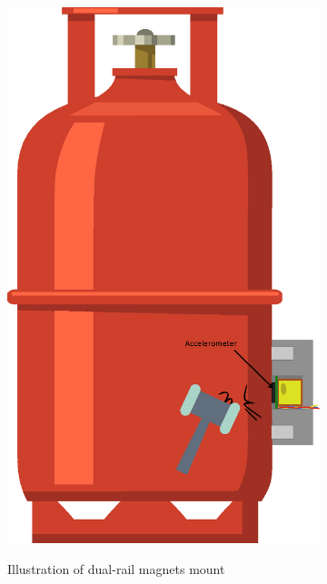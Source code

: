 \begin{figure}[]
    \centering
    \begin{subfigure}{0.3\textwidth}
        \includegraphics[width=\linewidth]{Chapters/4CHP/Figures/AccMagnets.eps}
        \caption{Illustration of dual-rail magnets mount}{}
        \label{subfig:mounMagnetDual}
    \end{subfigure}
    \begin{subfigure}{0.3\textwidth}

\end{subfigure}
\end{figure}
